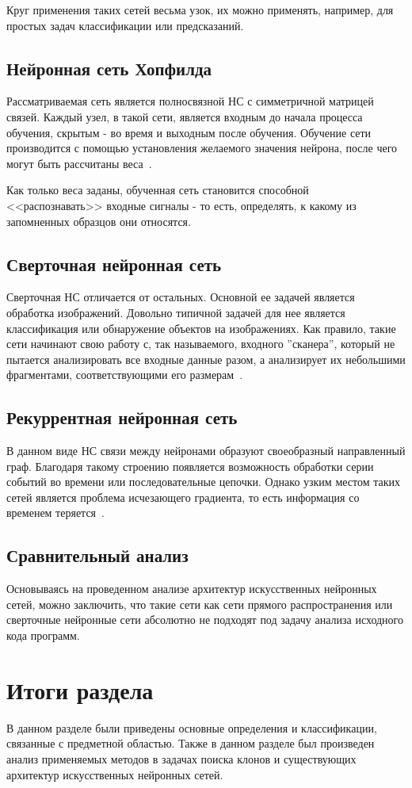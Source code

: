 Круг применения таких сетей весьма узок, их можно применять, например, для простых задач классификации или предсказаний. 

\subsection{Нейронная сеть Хопфилда}

Рассматриваемая сеть является полносвязной НС с симметричной матрицей связей. Каждый узел, в такой сети, является входным до начала процесса обучения, скрытым - во время и выходным после обучения. Обучение сети производится с помощью установления желаемого значения нейрона, после чего могут быть рассчитаны веса~\cite{hopfield}. 

Как только веса заданы, обученная сеть становится способной <<распознавать>> входные сигналы - то есть, определять, к какому из запомненных образцов они относятся.

\subsection{Сверточная нейронная сеть}

Сверточная НС отличается от остальных. Основной ее задачей является обработка изображений. Довольно типичной задачей для нее является классификация или обнаружение объектов на изображениях. Как правило, такие сети начинают свою работу с, так называемого, входного ''сканера'', который не пытается анализировать все входные данные разом, а анализирует их небольшими фрагментами, соответствующими его размерам~\cite{cnn}. 

\subsection{Рекуррентная нейронная сеть}

В данном виде НС связи между нейронами образуют своеобразный направленный граф. Благодаря такому строению появляется возможность обработки серии событий во времени или последовательные цепочки. Однако узким местом таких сетей является проблема исчезающего градиента, то есть информация со временем теряется~\cite{rnn}.

\subsection{Сравнительный анализ}

Основываясь на проведенном анализе архитектур искусственных нейронных сетей, можно заключить, что такие сети как сети прямого распространения или сверточные нейронные сети абсолютно не подходят под задачу анализа исходного кода программ.

\section{Итоги раздела}

В данном разделе были приведены основные определения и классификации, связанные с предметной областью. Также в данном разделе был произведен анализ применяемых методов в задачах поиска клонов и существующих архитектур искусственных нейронных сетей.
